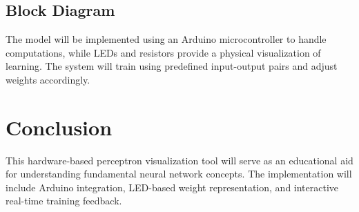\documentclass[a4paper,10pt]{article}
\begin{document}
\subsection{Block Diagram}
\begin{center}
\end{center}

The model will be implemented using an Arduino microcontroller to handle computations, while LEDs and resistors provide a physical visualization of learning. The system will train using predefined input-output pairs and adjust weights accordingly. 

\section{Conclusion}
This hardware-based perceptron visualization tool will serve as an educational aid for understanding fundamental neural network concepts. The implementation will include Arduino integration, LED-based weight representation, and interactive real-time training feedback.
\end{document}
